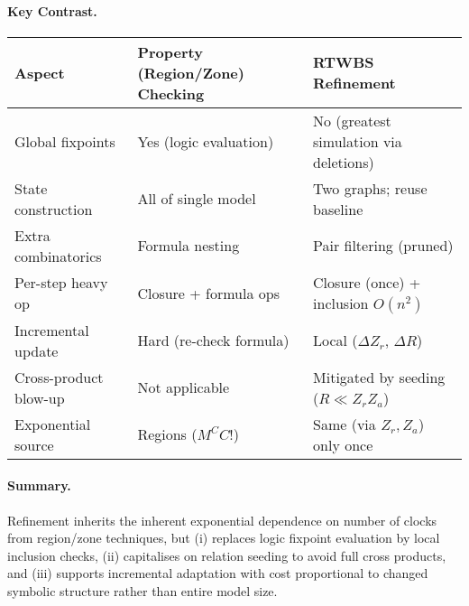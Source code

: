 \paragraph{Key Contrast.}
\begin{center}
\begin{tabular}{l|l|l}
Aspect & Property (Region/Zone) Checking & RTWBS Refinement \\\hline
Global fixpoints & Yes (logic evaluation) & No (greatest simulation via deletions) \\
State construction & All of single model & Two graphs; reuse baseline \\
Extra combinatorics & Formula nesting & Pair filtering (pruned) \\
Per-step heavy op & Closure + formula ops & Closure (once) + inclusion $O(n^2)$ \\
Incremental update & Hard (re-check formula) & Local ($\Delta Z_r$, $\Delta R$) \\
Cross-product blow-up & Not applicable & Mitigated by seeding ($R \ll Z_r Z_a$) \\
Exponential source & Regions ($M^{C} C!$) & Same (via $Z_r,Z_a$) only once \\
\end{tabular}
\end{center}

\paragraph{Summary.} Refinement inherits the inherent exponential dependence on number of clocks from region/zone techniques, but (i) replaces logic fixpoint evaluation by local inclusion checks, (ii) capitalises on relation seeding to avoid full cross products, and (iii) supports incremental adaptation with cost proportional to changed symbolic structure rather than entire model size.

